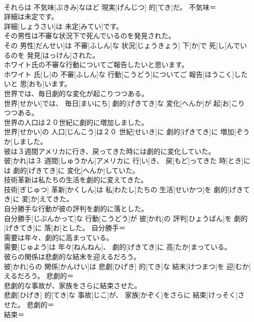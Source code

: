 \documentclass[8pt]{extreport}
\begin{document}
\begin{CJK}{UTF8}{min}
\\	それらは 不気味[ぶきみ]なほど 現実[げんじつ] 的[てき]だ。	不気味＝ 
\\	詳細は未定です。	
\\	詳細[しょうさい]は 未定[みてい]です。	
\\	その男性は不審な状況下で死んでいるのを発見された。	
\\	その 男性[だんせい]は 不審[ふしん]な 状況[じょうきょう] 下[か]で 死[し]んでいるのを 発見[はっけん]された。	
\\	ホワイト氏の不審な行動についてご報告したいと思います。	
\\	ホワイト 氏[し]の 不審[ふしん]な 行動[こうどう]についてご 報告[ほうこく]したいと 思[おも]います。	
\\	世界では、毎日劇的な変化が起こりつつある。	
\\	世界[せかい]では、 毎日[まいにち] 劇的[げきてき]な 変化[へんか]が 起[お]こりつつある。	
\\	世界の人口は２０世紀に劇的に増加しました。	
\\	世界[せかい]の 人口[じんこう]は２０ 世紀[せいき]に 劇的[げきてき]に 増加[ぞうか]しました。	
\\	彼は３週間アメリカに行き、戻ってきた時には劇的に変化していた。	
\\	彼[かれ]は３ 週間[しゅうかん]アメリカに 行[い]き、 戻[もど]ってきた 時[とき]には 劇的[げきてき]に 変化[へんか]していた。	
\\	技術革新は私たちの生活を劇的に変えてきた。	
\\	技術[ぎじゅつ] 革新[かくしん]は 私[わたし]たちの 生活[せいかつ]を 劇的[げきてき]に 変[か]えてきた。	
\\	自分勝手な行動が彼の評判を劇的に落とした。	
\\	自分勝手[じぶんかって]な 行動[こうどう]が 彼[かれ]の 評判[ひょうばん]を 劇的[げきてき]に 落[お]とした。	自分勝手＝ 
\\	需要は年々、劇的に高まっている。	
\\	需要[じゅよう]は 年々[ねんねん]、 劇的[げきてき]に 高[たか]まっている。	
\\	彼らの関係は悲劇的な結末を迎えるだろう。	
\\	彼[かれ]らの 関係[かんけい]は 悲劇[ひげき] 的[てき]な 結末[けつまつ]を 迎[むか]えるだろう。	悲劇的＝ 
\\	悲劇的な事故が、家族をさらに結束させた。	
\\	悲劇[ひげき] 的[てき]な 事故[じこ]が、 家族[かぞく]をさらに 結束[けっそく]させた。	悲劇的＝ 
\\	結束＝ 

\end{CJK}
\end{document}
